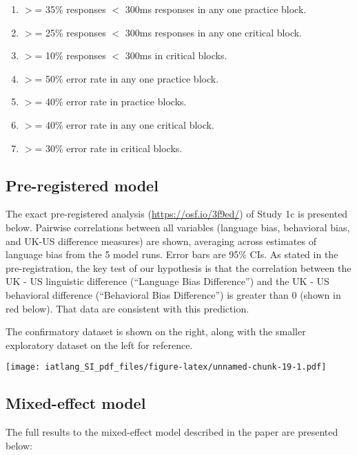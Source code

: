 \documentclass[]{article}
\providecommand{\tightlist}{%
  \setlength{\itemsep}{0pt}\setlength{\parskip}{0pt}}
\begin{document}
\begin{enumerate}
\def\labelenumi{\arabic{enumi}.}
\tightlist
\item
  \(>\)= 35\% responses \(<\) 300ms responses in any one practice block.
\item
  \(>\)= 25\% responses \(<\) 300ms responses in any one critical block.
\item
  \(>\)= 10\% responses \(<\) 300ms in critical blocks.
\item
  \(>\)= 50\% error rate in any one practice block.
\item
  \(>\)= 40\% error rate in practice blocks.
\item
  \(>\)= 40\% error rate in any one critical block.
\item
  \(>\)= 30\% error rate in critical blocks.
\end{enumerate}

\hypertarget{pre-registered-model}{%
\subsection{Pre-registered model}\label{pre-registered-model}}

The exact pre-registered analysis (\url{https://osf.io/3f9ed/}) of Study
1c is presented below. Pairwise correlations between all variables
(language bias, behavioral bias, and UK-US difference measures) are
shown, averaging across estimates of language bias from the 5 model
runs. Error bars are 95\% CIs. As stated in the pre-registration, the
key test of our hypothesis is that the correlation between the UK - US
linguistic difference (``Language Bias Difference'') and the UK - US
behavioral difference (``Behavioral Bias Difference'') is greater than 0
(shown in red below). That data are consistent with this prediction.

The confirmatory dataset is shown on the right, along with the smaller
exploratory dataset on the left for reference.

\texttt{[image: iatlang\_SI\_pdf\_files/figure-latex/unnamed-chunk-19-1.pdf]}

\hypertarget{mixed-effect-model}{%
\subsection{Mixed-effect model}\label{mixed-effect-model}}

The full results to the mixed-effect model described in the paper are
presented below:
\end{document}
